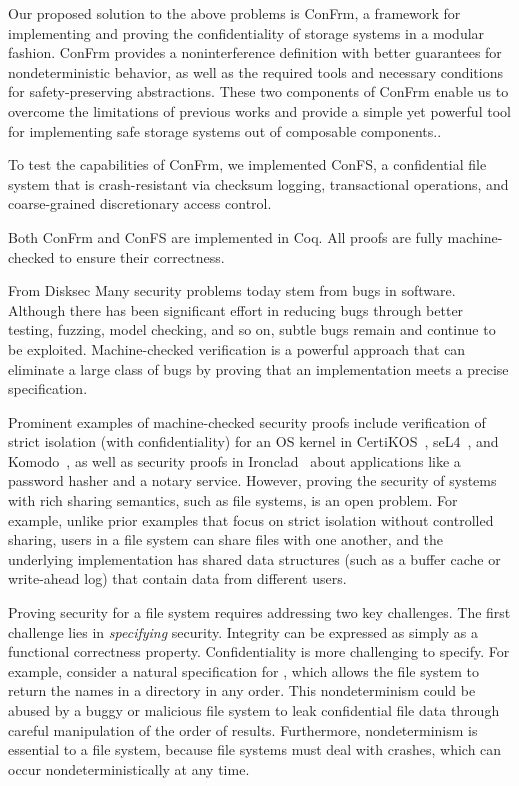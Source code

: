 Our proposed solution to the above problems is ConFrm, a framework for 
implementing and proving the confidentiality of storage systems in a modular fashion. ConFrm provides a noninterference definition with better guarantees for nondeterministic behavior, as well as the required tools and necessary conditions for safety-preserving abstractions. These two components of ConFrm enable us to overcome the limitations of previous works and provide a simple yet powerful tool for implementing safe storage systems out of composable components..


To test the capabilities of ConFrm, we implemented ConFS, a confidential file system that is crash-resistant via checksum logging, transactional operations, and coarse-grained discretionary access control. 

Both ConFrm and ConFS are implemented in Coq. All proofs are fully machine-checked to ensure their correctness. 

{\color{red}From Disksec}
Many security problems today stem from bugs in software.  Although there
has been significant effort in reducing bugs through better testing,
fuzzing, model checking, and so on, subtle bugs remain and continue
to be exploited.  Machine-checked verification is a powerful approach
that can eliminate a large class of bugs by proving that an
implementation meets a precise specification.

Prominent examples of machine-checked security proofs include verification of
strict isolation (with confidentiality) for an OS kernel in CertiKOS~\cite{costanzo:certikos-infoflow},
seL4~\cite{murray:sel4-infoflow}, and Komodo~\cite{ferraiuolo:komodo}, as well as security proofs in Ironclad~\cite{hawblitzel:ironclad} about applications
like a password hasher and a notary service.  However, proving the
security of systems with rich sharing semantics, such as file systems,
is an open problem.  For example, unlike prior examples that focus on
strict isolation without controlled sharing, users in a file system
can share files with one another, and the underlying implementation
has shared data structures (such as a buffer cache or write-ahead log)
that contain data from different users.

Proving security for a file system requires addressing two key challenges.
The first challenge lies in \emph{specifying} security. Integrity can be
expressed as simply as a functional correctness property. Confidentiality is more
challenging to specify. For example, consider
a natural specification for , which allows the file system to return
the names in a directory in any order.  This nondeterminism could be
abused by a buggy or malicious file system to leak confidential file
data through careful manipulation of the order of  results.
Furthermore, nondeterminism is essential to a file system, because file
systems must deal with crashes, which can occur nondeterministically
at any time.

